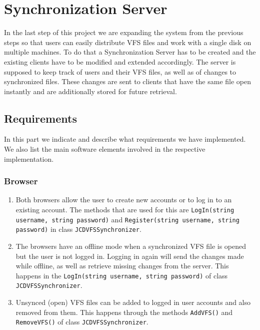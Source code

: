 \documentclass[a4paper,12pt]{article}
\begin{document}

\section{Synchronization Server}
In the last step of this project we are expanding the system from the previous steps so that users can easily distribute VFS files and work with a single disk on multiple machines. To do that a Synchronization Server has to be created and the existing clients have to be modified and extended accordingly.\newline
The server is supposed to keep track of users and their VFS files, as well as of changes to synchronized files. These changes are sent to clients that have the same file open instantly and are additionally stored for future retrieval.


\subsection{Requirements}
In this part we indicate and describe what requirements we have implemented. We also list the main software elements involved in the respective implementation.

\subsubsection{Browser}
\begin{enumerate}
	\item Both browsers allow the user to create new accounts or to log in to an existing account. The methods that are used for this are \texttt{LogIn(string username, string password)} and \texttt{Register(string username, string password)} in class \texttt{JCDVFSSynchronizer}.
	\item The browsers have an offline mode when a synchronized VFS file is opened but the user is not logged in. Logging in again will send the changes made while offline, as well as retrieve missing changes from the server. This happens in the \texttt{LogIn(string username, string password)} of class \texttt{JCDVFSSynchronizer}.
	\item Unsynced (open) VFS files can be added to logged in user accounts and also removed from them. This happens through the methods \texttt{AddVFS()} and \texttt{RemoveVFS()} of class \texttt{JCDVFSSynchronizer}.
	\end{enumerate}
\end{document}
